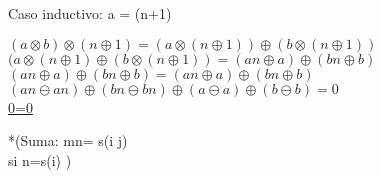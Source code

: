 \documentclass{article}
\begin{document}
Caso inductivo: a = (n+1)\\\medskip

$(a \otimes b) \otimes (n \oplus 1) = (a \otimes (n \oplus 1)) \oplus (b \otimes (n \oplus 1))$\\

$(a \otimes (n \oplus 1) \oplus (b \otimes (n \oplus 1)) = (an \oplus a) \oplus (bn \oplus b)$\\
$(an \oplus a) \oplus (bn \oplus b) = (an \oplus a) \oplus (bn \oplus b)$\\

$(an \ominus an) \oplus (bn \ominus bn) \oplus (a \ominus a) \oplus (b \ominus b) = 0$\\
\underline{0=0}


\bigskip
\bigskip

*(Suma:
m\oplus n= s(i \oplus j)\\
si n=s(i) )
\end{document}
